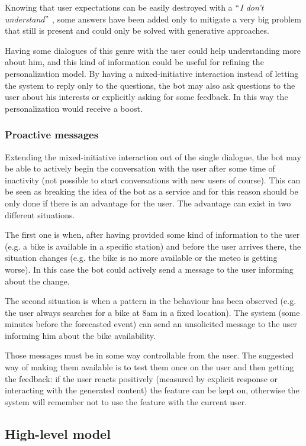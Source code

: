Knowing that user expectations can be easily destroyed with a $``$\textit{I don't understand}$"$ , some answers have been added only to mitigate a very big problem that still is present and could only be solved with generative approaches.

Having some dialogues of this genre with the user could help understanding more about him, and this kind of information could be useful for refining the personalization model. By having a mixed-initiative interaction instead of letting the system to reply only to the questions, the bot may also ask questions to the user about his interests or explicitly asking for some feedback. In this way the personalization would receive a boost.

\subsubsection{Proactive messages}
Extending the mixed-initiative interaction out of the single dialogue, the bot may be able to actively begin the conversation with the user after some time of inactivity (not possible to start conversations with new users of course). This can be seen as breaking the idea of the bot as a service and for this reason should be only done if there is an advantage for the user. The advantage can exist in two different situations.

The first one is when, after having provided some kind of information to the user (e.g. a bike is available in a specific station) and before the user arrives there, the situation changes (e.g. the bike is no more available or the meteo is getting worse). In this case the bot could actively send a message to the user informing about the change.

The second situation is when a pattern in the behaviour has been observed (e.g. the user always searches for a bike at 8am in a fixed location). The system (some minutes before the forecasted event) can send an unsolicited message to the user informing him about the bike availability.

Those messages must be in some way controllable from the user. The suggested way of making them available is to test them once on the user and then getting the feedback: if the user reacts positively (measured by explicit response or interacting with the generated content) the feature can be kept on, otherwise the system will remember not to use the feature with the current user.

\subsection{High-level model}
\label{approachModel}

